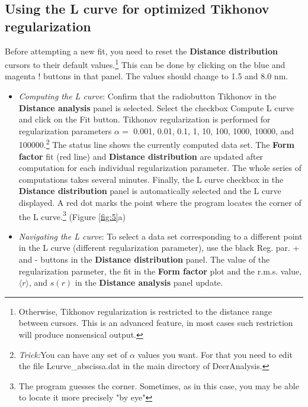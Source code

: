 \documentclass[11pt,a4paper]{article}
\begin{document}
\subsection{Using the L curve for optimized Tikhonov regularization}

Before attempting a new fit, you need to reset the {\ttfamily \bf Distance distribution} cursors to their default values.\footnote{Otherwise, Tikhonov regularization is restricted to the distance range between cursors. This is an advanced feature, in most cases such restriction will produce nonsensical output.} This can be done by clicking on the blue and magenta {\ttfamily !} buttons in that panel. The values should change to 1.5 and 8.0 nm.

\begin{itemize}
\item \emph{Computing the L curve}: Confirm that the radiobutton {\ttfamily Tikhonov} in the {\ttfamily \bf Distance analysis} panel is selected. Select the checkbox {\ttfamily Compute L curve} and click on the {\ttfamily Fit} button. Tikhonov regularization is performed for regularization parameters $\alpha =$ 0.001, 0.01, 0.1, 1, 10, 100, 1000, 10000, and 100000.\footnote{\emph{Trick:}You can have any set of $\alpha$ values you want. For that you need to edit the file {\ttfamily Lcurve\_abscissa.dat} in the main directory of DeerAnalysis.} The status line shows the currently computed data set. The {\ttfamily \bf Form factor} fit (red line) and {\ttfamily \bf Distance distribution} are updated after computation for each individual regularization parameter. The whole series of computations takes several minutes. Finally, the {\ttfamily L curve} checkbox in the {\ttfamily \bf Distance distribution} panel is automatically selected and the L curve displayed. A red dot marks the point where the program locates the corner of the L curve.\footnote{The program guesses the corner. Sometimes, as in this case, you may be able to locate it more precisely "by eye"} (Figure \ref{fig:5}a) 
\item \emph{Navigating the L curve}: To select a data set corresponding to a different point in the L curve (different regularization parameter), use the black {\ttfamily Reg. par. +} and {\ttfamily -} buttons in the {\ttfamily \bf Distance distribution} panel. The value of the regularization parmeter, the fit in the {\ttfamily \bf Form factor} plot and the {\ttfamily r.m.s.} value, $\langle r \rangle$, and $s(r)$ in the {\ttfamily \bf Distance analysis} panel update.
\end{itemize}
\end{document}
